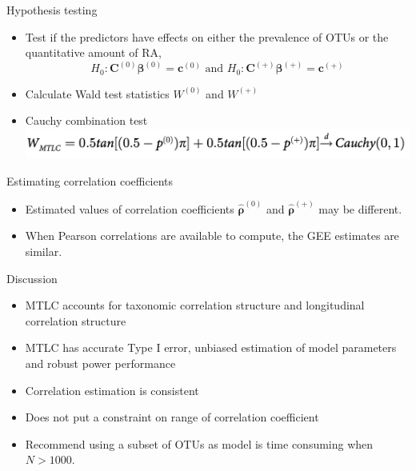 \documentclass{beamer}
\begin{document}
\begin{frame}[t]{Hypothesis testing }
  \begin{itemize}
    \item Test if the predictors have effects on either the prevalence of OTUs or the quantitative amount of RA,
    $$H_0: \boldsymbol{C}^{(0)}\boldsymbol\beta^{(0)} = \boldsymbol{c}^{(0)} \text{ and } H_0: \boldsymbol{C}^{(+)}\boldsymbol\beta^{(+)} = \boldsymbol{c}^{(+)}$$
    \item Calculate Wald test statistics $W^{(0)}$ and $W^{(+)}$
    \item Cauchy combination test
    \includegraphics[width = \textwidth]{cauchy.png}
  \end{itemize}

\end{frame}

\begin{frame}[t]{Estimating correlation coefficients }
  \begin{itemize}
    \item Estimated values of correlation coefficients $\hat{\boldsymbol\rho}^{(0)}$ and $\hat{\boldsymbol\rho}^{(+)}$ may be different.
    \item When Pearson correlations are available to compute, the GEE estimates are similar.
  \end{itemize}
\end{frame}





\begin{frame}[t]{Discussion}
  \begin{itemize}
    \item MTLC accounts for taxonomic correlation structure and longitudinal correlation structure
    \item MTLC has accurate Type I error, unbiased estimation of model parameters and robust power performance
    \item Correlation estimation is consistent
    \item Does not put a constraint on range of correlation coefficient
    \item Recommend using a subset of OTUs as model is time consuming when $N > 1000$.
  \end{itemize}
\end{frame}
\end{document}
